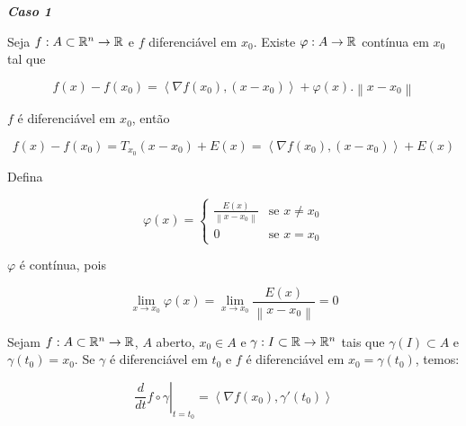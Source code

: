 \documentclass{book}
\begin{document}
\textit{\textbf{Caso 1}}

\begin{lem} \label{lem01}
    Seja $f:A \subset \mathbb{R}^n  \to \mathbb{R}$ e $f$ diferenci\'avel em $x_0$. Existe $\varphi :A \to \mathbb{R}$ cont\'inua em $x_0$ tal que

\[
f\left( x \right) - f\left( {x_0 } \right) = \left\langle {\nabla f\left( {x_0 } \right),\left( {x - x_0 } \right)} \right\rangle  + \varphi \left( x \right).\left\| {x - x_0 } \right\|
\]
\end{lem}

\begin{dem}
$f$ \'e diferenci\'avel em $x_0$, ent\~ao

\[
f\left( x \right) - f\left( {x_0 } \right) = T_{x_0 } \left( {x - x_0 } \right) + E\left( x \right) = \left\langle {\nabla f\left( {x_0 } \right),\left( {x - x_0 } \right)} \right\rangle  + E\left( x \right)
\]

Defina

\begin{equation*}
\varphi(x)=\left\{ \begin{array}{cl}\displaystyle
\frac{{E(x)}}{{\left\| {x - x_0 } \right\|}} & \textrm{se }x \ne x_0\\
0 & \textrm{se }x=x_0\end{array}\right.
\end{equation*}

$\varphi$ \'e cont\'inua, pois

\[
\mathop {\lim }\limits_{x \to x_0 } \varphi \left( x \right) = \mathop {\lim }\limits_{x \to x_0 } \frac{{E\left( x \right)}}
{{\left\| {x - x_0 } \right\|}} = 0
\]

\end{dem}

\begin{teo}
    Sejam $f:A \subset \mathbb{R}^n \to \mathbb{R}$, $A$ aberto, $x_0 \in A$ e $\gamma: I \subset \mathbb{R} \to \mathbb{R}^n$ tais que $\gamma \left( I \right) \subset A$ e $\gamma \left( {t_0 } \right) = x_0$. Se $\gamma$ \'e diferenci\'avel em $t_0$ e $f$ \'e diferenci\'avel em $x_0  = \gamma \left( {t_0 } \right)$, temos:

\[
\left. {\frac{d}
{{dt}}f \circ \gamma } \right|_{t = t_0 }  = \left\langle {\nabla f\left( {x_0 } \right),\gamma '\left( {t_0 } \right)} \right\rangle
\]

\end{teo}
\end{document}
